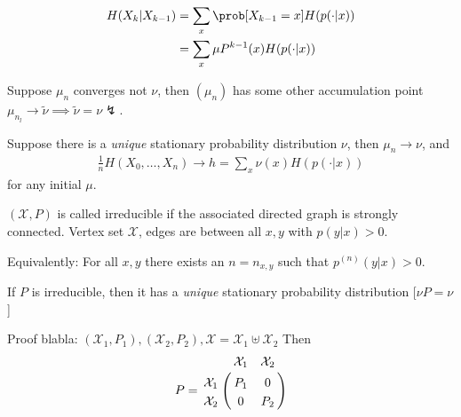 \documentclass[mfit.tex]{subfiles}
\begin{document}
\begin{align*}
  H(X_k|X_{k-1}) &= \sum_x \prob[X_{k-1} = x] H(p(\cdot|x)) \\
  &= \sum_x \mu P^{k-1}(x) H(p(\cdot|x))
\end{align*}

\begin{rem}
  Suppose $\mu_n$ converges not $\nu$, then $(\mu_n)$ has some other accumulation point $\mu_{n_l} \to \tilde{\nu} \implies \tilde{\nu} = \nu \lightning$.
\end{rem}

\begin{theorem}
  Suppose there is a \emph{unique} stationary probability distribution $\nu$,
  then $\mu_n \to \nu$, and 
  \begin{align*}
    \frac{1}{n} H(X_0,\dots,X_n) \to h = \sum_x \nu(x) H(p(\cdot|x))
  \end{align*}
  for any initial $\mu$.
\end{theorem}

\begin{defi*}
  $(\mathcal{X},P)$ is called irreducible if the associated directed graph is strongly connected.
  Vertex set $\mathcal{X}$, edges are between all $x,y$ with $p(y|x) > 0$.
  
  Equivalently: For all $x,y$ there exists an $n = n_{x,y}$ such that $p^{(n)}(y|x) > 0$.
\end{defi*}

\begin{theorem}
  If $P$ is irreducible, then it has a \emph{unique} stationary probability distribution [$\nu P = \nu$]
\end{theorem}

Proof blabla:
$(\mathcal{X}_1,P_1), (\mathcal{X}_2,P_2), \mathcal{X} = \mathcal{X}_1 \uplus \mathcal{X}_2$
Then 
\begin{align*}
  P = \bordermatrix{
  ~ & \mathcal{X}_1 & \mathcal{X}_2 \cr
  \mathcal{X}_1 & P_1 & 0 \cr
  \mathcal{X}_2 & 0 & P_2 \cr
  }
\end{align*}
\end{document}
